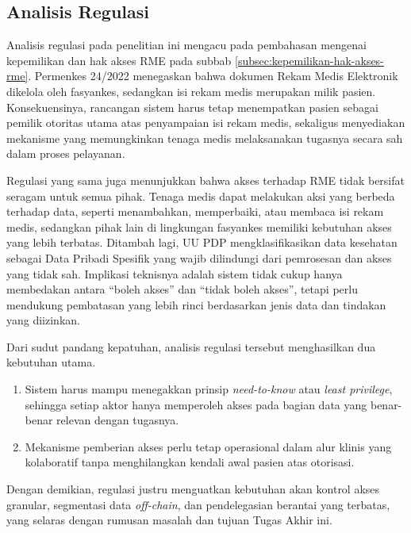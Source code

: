 \subsection{Analisis Regulasi}
\label{subsec:analisis-regulasi}
Analisis regulasi pada penelitian ini mengacu pada pembahasan mengenai kepemilikan dan hak akses RME pada subbab \ref{subsec:kepemilikan-hak-akses-rme}. Permenkes 24/2022 menegaskan bahwa dokumen Rekam Medis Elektronik dikelola oleh fasyankes, sedangkan isi rekam medis merupakan milik pasien. Konsekuensinya, rancangan sistem harus tetap menempatkan pasien sebagai pemilik otoritas utama atas penyampaian isi rekam medis, sekaligus menyediakan mekanisme yang memungkinkan tenaga medis melaksanakan tugasnya secara sah dalam proses pelayanan.

Regulasi yang sama juga menunjukkan bahwa akses terhadap RME tidak bersifat seragam untuk semua pihak. Tenaga medis dapat melakukan aksi yang berbeda terhadap data, seperti menambahkan, memperbaiki, atau membaca isi rekam medis, sedangkan pihak lain di lingkungan fasyankes memiliki kebutuhan akses yang lebih terbatas. Ditambah lagi, UU PDP mengklasifikasikan data kesehatan sebagai Data Pribadi Spesifik yang wajib dilindungi dari pemrosesan dan akses yang tidak sah. Implikasi teknisnya adalah sistem tidak cukup hanya membedakan antara ``boleh akses'' dan ``tidak boleh akses'', tetapi perlu mendukung pembatasan yang lebih rinci berdasarkan jenis data dan tindakan yang diizinkan.

Dari sudut pandang kepatuhan, analisis regulasi tersebut menghasilkan dua kebutuhan utama.
\begin{enumerate}
    \item Sistem harus mampu menegakkan prinsip \textit{need-to-know} atau \textit{least privilege}, sehingga setiap aktor hanya memperoleh akses pada bagian data yang benar-benar relevan dengan tugasnya.
    \item Mekanisme pemberian akses perlu tetap operasional dalam alur klinis yang kolaboratif tanpa menghilangkan kendali awal pasien atas otorisasi.
\end{enumerate}
Dengan demikian, regulasi justru menguatkan kebutuhan akan kontrol akses granular, segmentasi data \textit{off-chain}, dan pendelegasian berantai yang terbatas, yang selaras dengan rumusan masalah dan tujuan Tugas Akhir ini.